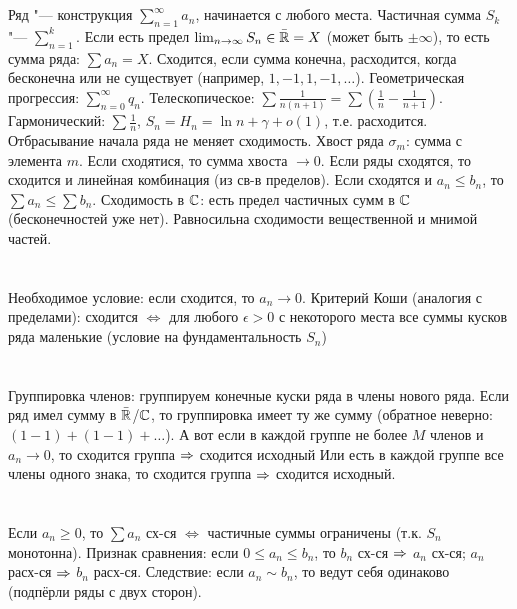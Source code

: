 \section{} %
Ряд "--- конструкция $\sum_{n=1}^\infty a_n$, начинается с любого места.
Частичная сумма $S_k$ "--- $\sum_{n=1}^k$.
Если есть предел $\lim_{n\to \infty} S_n \in \bar {\mathbb{R}} = X$ (может быть $\pm\infty$), то есть сумма ряда: $\sum a_n = X$.
Сходится, если сумма конечна, расходится, когда бесконечна или не существует (например, $1, -1, 1, -1, \dots$).
Геометрическая прогрессия: $\sum_{n=0}^\infty q_n$.
Телескопическое: $\sum \frac{1}{n(n+1)} = \sum \left(\frac 1 n - \frac 1 {n+1}\right)$.
Гармонический: $\sum \frac 1 n$, $S_n = H_n = \ln n + \gamma + o(1)$, т.е. расходится.
Отбрасывание начала ряда не меняет сходимость.
Хвост ряда $\sigma_m$: сумма с элемента $m$.
Если сходятися, то сумма хвоста $\to 0$.
Если ряды сходятся, то сходится и линейная комбинация (из св-в пределов).
Если сходятся и $a_n \le b_n$, то $\sum a_n \le \sum b_n$.
Сходимость в $\mathbb{C}$: есть предел частичных сумм в $\mathbb{C}$ (бесконечностей уже нет).
Равносильна сходимости вещественной и мнимой частей.

\section{} %
Необходимое условие: если сходится, то $a_n \to 0$.
Критерий Коши (аналогия с пределами): сходится $\iff$ для любого $\epsilon > 0$ с некоторого места все суммы кусков ряда маленькие
(условие на фундаментальность $S_n$)

\section{} %
Группировка членов: группируем конечные куски ряда в члены нового ряда.
Если ряд имел сумму в $\bar {\mathbb{R}}$/$\mathbb{C}$, то группировка имеет ту же сумму (обратное неверно: $(1-1)+(1-1)+\dots$).
А вот если в каждой группе не более $M$ членов и $a_n \to 0$, то сходится группа $\Rightarrow$ сходится исходный
Или есть в каждой группе все члены одного знака, то сходится группа $\Rightarrow$ сходится исходный.

\section{} %
Если $a_n \ge 0$, то $\sum a_n$ сх-ся $\iff$ частичные суммы ограничены (т.к. $S_n$ монотонна).
Признак сравнения: если $0 \le a_n \le b_n$, то $b_n$ сх-ся $\Rightarrow$ $a_n$ сх-ся; $a_n$ расх-ся $\Rightarrow$ $b_n$ расх-ся.
Следствие: если $a_n \sim b_n$, то ведут себя одинаково (подпёрли ряды с двух сторон).

